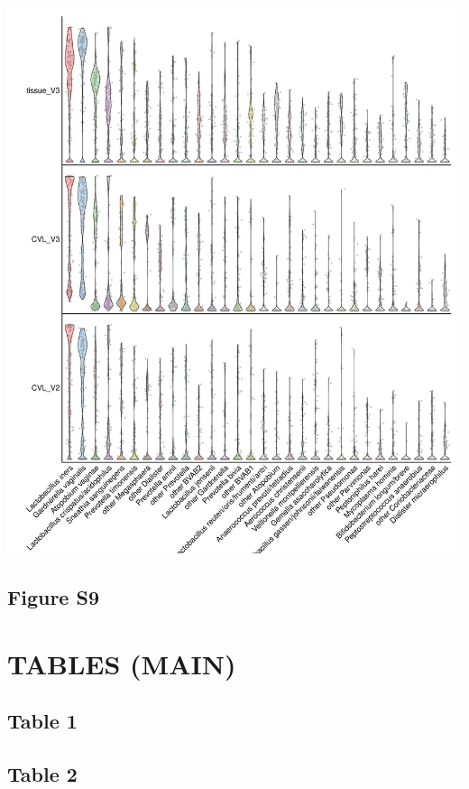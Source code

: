 \documentclass[
]{article}
\begin{document}
\includegraphics[width=1\linewidth]{manuscript_template_files/figure-latex/unnamed-chunk-17-1}

\clearpage

\hypertarget{figure-s9}{%
\subsection{Figure S9}\label{figure-s9}}

\clearpage

\hypertarget{tables-main}{%
\section{TABLES (MAIN)}\label{tables-main}}

\hypertarget{table-1}{%
\subsection{Table 1}\label{table-1}}

\clearpage

\hypertarget{table-2}{%
\subsection{Table 2}\label{table-2}}
\end{document}
